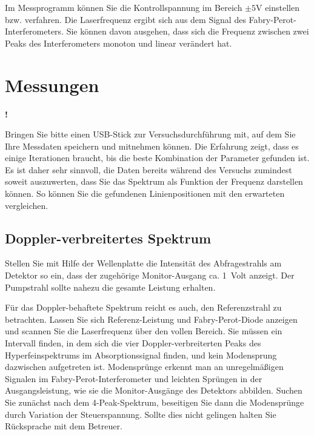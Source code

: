 Im Messprogramm können Sie die Kontrollspannung im Bereich $\pm 5$V einstellen bzw. verfahren. Die Laserfrequenz ergibt sich aus dem Signal des Fabry-Perot-Interferometers. Sie können davon ausgehen, dass sich die Frequenz zwischen zwei Peaks des Interferometers monoton und linear verändert hat. 


\section{Messungen}

\begin{marginfigure}[10mm]{\Huge \textbf{!}}\end{marginfigure}%
	Bringen Sie bitte einen USB-Stick zur Versuchsdurchführung mit, auf dem Sie Ihre Messdaten speichern und mitnehmen können.
Die Erfahrung zeigt, dass es einige Iterationen braucht, bis die beste Kombination der Parameter gefunden ist. Es ist daher sehr sinnvoll, die Daten bereits während des Versuchs zumindest soweit auszuwerten, dass Sie das Spektrum als Funktion der Frequenz darstellen können. So können Sie die gefundenen Linienpositionen mit den erwarteten vergleichen. 






\subsection{Doppler-verbreitertes Spektrum}

Stellen Sie mit Hilfe der Wellenplatte die Intensität des Abfragestrahls am Detektor so ein, dass der zugehörige Monitor-Ausgang ca. 1~Volt anzeigt. Der Pumpstrahl sollte nahezu die gesamte Leistung erhalten.

Für das Doppler-behaftete Spektrum reicht es auch, den Referenzstrahl zu betrachten. Lassen Sie sich Referenz-Leistung und Fabry-Perot-Diode anzeigen und scannen Sie die Laserfrequenz über den vollen Bereich. Sie müssen ein Intervall finden, in dem sich die vier Doppler-verbreiterten  Peaks des Hyperfeinspektrums im Absorptionssignal finden, und kein Modensprung dazwischen aufgetreten ist. Modensprünge erkennt man an unregelmäßigen Signalen im Fabry-Perot-Interferometer und leichten Sprüngen in der Ausgangsleistung, wie sie die Monitor-Ausgänge des Detektors abbilden. Suchen Sie zunächst nach dem 4-Peak-Spektrum, beseitigen Sie dann die Modensprünge durch Variation der Steuerspannung. Sollte dies nicht gelingen halten Sie  Rücksprache mit dem Betreuer.

